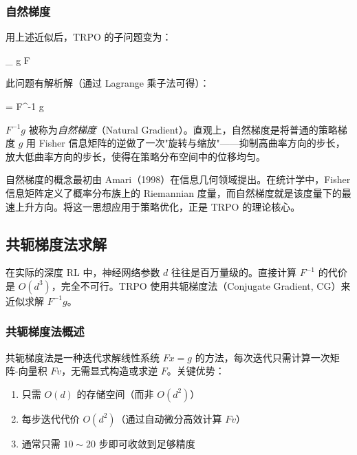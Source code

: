 \subsubsection{自然梯度}

用上述近似后，TRPO 的子问题变为：

\begin{myformula}
\max_{\Delta\theta} \quad g\T \Delta\theta \qquad
{} \quad {} \Delta\theta\T F \Delta\theta \le \delta
\end{myformula}

此问题有解析解（通过 Lagrange 乘子法可得）：

\begin{myformula}
\Delta\theta =  \; F^{-1} g
\end{myformula}

$F^{-1} g$ 被称为\emph{自然梯度}（Natural Gradient）。直观上，自然梯度是将普通的策略梯度 $g$ 用 Fisher 信息矩阵的逆做了一次"旋转与缩放"——抑制高曲率方向的步长，放大低曲率方向的步长，使得在策略分布空间中的位移均匀。

\begin{remark}
自然梯度的概念最初由 Amari（1998）在信息几何领域提出。在统计学中，Fisher 信息矩阵定义了概率分布族上的 Riemannian 度量，而自然梯度就是该度量下的最速上升方向。将这一思想应用于策略优化，正是 TRPO 的理论核心。
\end{remark}

\subsection{共轭梯度法求解}

在实际的深度 RL 中，神经网络参数 $d$ 往往是百万量级的。直接计算 $F^{-1}$ 的代价是 $O(d^3)$，完全不可行。TRPO 使用共轭梯度法（Conjugate Gradient, CG）来近似求解 $F^{-1}g$。

\subsubsection{共轭梯度法概述}

共轭梯度法是一种迭代求解线性系统 $F x = g$ 的方法，每次迭代只需计算一次矩阵-向量积 $F v$，无需显式构造或求逆 $F$。关键优势：

\begin{enumerate}
    \item 只需 $O(d)$ 的存储空间（而非 $O(d^2)$）
    \item 每步迭代代价 $O(d^2)$（通过自动微分高效计算 $F v$）
    \item 通常只需 $10 \sim 20$ 步即可收敛到足够精度
\end{enumerate}

